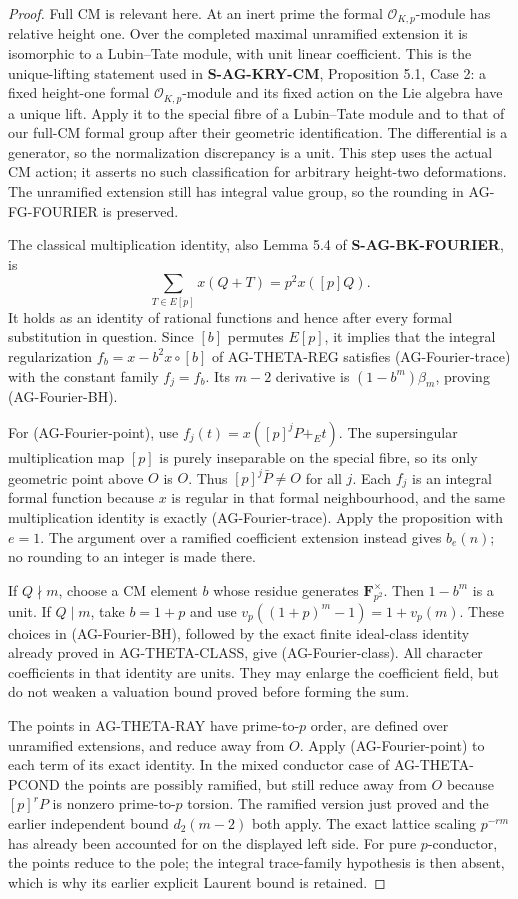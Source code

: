 \begin{proof}
Full CM is relevant here.  At an inert prime the formal
$\mathcal O_{K,p}$-module has relative height one.  Over the completed
maximal unramified extension it is isomorphic to a Lubin--Tate module,
with unit linear coefficient.  This is the unique-lifting statement
used in \textbf{S-AG-KRY-CM}, Proposition 5.1, Case 2: a fixed
height-one formal $\mathcal O_{K,p}$-module and its fixed action on the
Lie algebra have a unique lift.  Apply it to the special fibre of a
Lubin--Tate module and to that of our full-CM formal group after their
geometric identification.  The differential is a generator, so the
normalization discrepancy is a unit.  This step uses the actual CM
action; it asserts no such classification for arbitrary height-two
deformations.  The unramified extension still has integral value group,
so the rounding in AG-FG-FOURIER is preserved.

The classical multiplication identity, also Lemma 5.4 of
\textbf{S-AG-BK-FOURIER}, is
\[
          \sum_{T\in E[p]}x(Q+T)=p^2x([p]Q).
\]
It holds as an identity of rational functions and hence after every
formal substitution in question.  Since $[b]$ permutes $E[p]$, it
implies that the integral regularization
$f_b=x-b^2x\circ[b]$ of AG-THETA-REG satisfies
(AG-Fourier-trace) with the constant family $f_j=f_b$.
Its $m-2$ derivative is $(1-b^m)\beta_m$, proving
(AG-Fourier-BH).

For (AG-Fourier-point), use
$f_j(t)=x([p]^jP+_E t)$.  The supersingular multiplication map $[p]$
is purely inseparable on the special fibre, so its only geometric
point above $O$ is $O$.  Thus $[p]^j\bar P\ne O$ for all $j$.
Each $f_j$ is an integral formal function because $x$ is regular in
that formal neighbourhood, and the same multiplication identity is
exactly (AG-Fourier-trace).  Apply the proposition with $e=1$.
The argument over a ramified coefficient extension instead gives
$b_e(n)$; no rounding to an integer is made there.

If $Q\nmid m$, choose a CM element $b$ whose residue generates
$\mathbf F_{p^2}^{\times}$.  Then $1-b^m$ is a unit.  If $Q\mid m$,
take $b=1+p$ and use
$v_p((1+p)^m-1)=1+v_p(m)$.  These choices in (AG-Fourier-BH),
followed by the exact finite ideal-class identity already proved in
AG-THETA-CLASS, give (AG-Fourier-class).  All character coefficients
in that identity are units.  They may enlarge the coefficient field,
but do not weaken a valuation bound proved before forming the sum.

The points in AG-THETA-RAY have prime-to-$p$ order, are defined over
unramified extensions, and reduce away from $O$.  Apply
(AG-Fourier-point) to each term of its exact identity.  In the mixed
conductor case of AG-THETA-PCOND the points are possibly ramified,
but still reduce away from $O$ because $[p]^rP$ is nonzero
prime-to-$p$ torsion.  The ramified version just proved and the earlier
independent bound $d_2(m-2)$ both apply.  The exact lattice scaling
$p^{-rm}$ has already been accounted for on the displayed left side.
For pure $p$-conductor, the points reduce to the pole; the integral
trace-family hypothesis is then absent, which is why its earlier
explicit Laurent bound is retained.
\end{proof}

